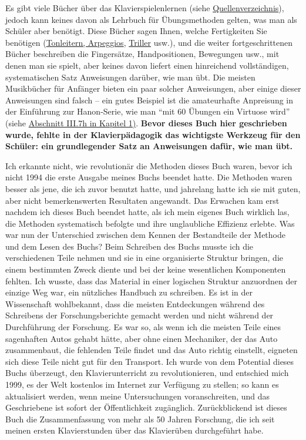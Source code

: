Es gibt viele Bücher über das Klavierspielenlernen (siehe \hyperref[reference]{Quellenverzeichnis}), jedoch kann keines davon als Lehrbuch für Übungsmethoden gelten, was man als Schüler aber benötigt.
Diese Bücher sagen Ihnen, welche Fertigkeiten Sie benötigen (\hyperref[c1iii5]{Tonleitern, Arpeggios}, \hyperref[c1iii3]{Triller} usw.), und die weiter fortgeschrittenen Bücher beschreiben die Fingersätze, Handpositionen, Bewegungen usw., mit denen man sie spielt, aber keines davon liefert einen hinreichend vollständigen, systematischen Satz Anweisungen darüber, wie man übt.
Die meisten Musikbücher für Anfänger bieten ein paar solcher Anweisungen, aber einige dieser Anweisungen sind falsch -- ein gutes Beispiel ist die amateurhafte Anpreisung in der Einführung zur Hanon-Serie, wie man \enquote{mit 60 Übungen ein Virtuose wird} (siehe \hyperref[c1iii7h]{Abschnitt III.7h in Kapitel 1)}.
\textbf{Bevor dieses Buch hier geschrieben wurde, fehlte in der Klavierpädagogik das wichtigste Werkzeug für den Schüler: ein grundlegender Satz an Anweisungen dafür, wie man übt.}

Ich erkannte nicht, wie revolutionär die Methoden dieses Buch waren, bevor ich nicht 1994 die erste Ausgabe meines Buchs beendet hatte.
Die Methoden waren besser als jene, die ich zuvor benutzt hatte, und jahrelang hatte ich sie mit guten, aber nicht bemerkenswerten Resultaten angewandt.
Das Erwachen kam erst nachdem ich dieses Buch beendet hatte, als ich mein eigenes Buch wirklich las, die Methoden systematisch befolgte und ihre unglaubliche Effizienz erlebte.
Was war nun der Unterschied zwischen dem Kennen der Bestandteile der Methode und dem Lesen des Buchs?
Beim Schreiben des Buchs musste ich die verschiedenen Teile nehmen und sie in eine organisierte Struktur bringen, die einem bestimmten Zweck diente und bei der keine wesentlichen Komponenten fehlten.
Ich wusste, dass das Material in einer logischen Struktur anzuordnen der einzige Weg war, ein nützliches Handbuch zu schreiben.
Es ist in der Wissenschaft wohlbekannt, dass die meisten Entdeckungen während des Schreibens der Forschungsberichte gemacht werden und nicht während der Durchführung der Forschung.
Es war so, als wenn ich die meisten Teile eines sagenhaften Autos gehabt hätte, aber ohne einen Mechaniker, der das Auto zusammenbaut, die fehlenden Teile findet und das Auto richtig einstellt, eigneten sich diese Teile nicht gut für den Transport.
Ich wurde von dem Potential dieses Buchs überzeugt, den Klavierunterricht zu revolutionieren, und entschied mich 1999, es der Welt kostenlos im Internet zur Verfügung zu stellen;
so kann es aktualisiert werden, wenn meine Untersuchungen voranschreiten, und das Geschriebene ist sofort der Öffentlichkeit zugänglich.
Zurückblickend ist dieses Buch die Zusammenfassung von mehr als 50 Jahren Forschung, die ich seit meinen ersten Klavierstunden über das Klavierüben durchgeführt habe.

